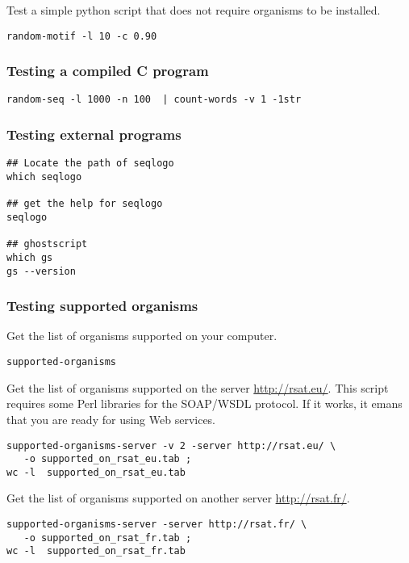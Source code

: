 \documentclass[12pt,a4paper, oneside]{scrreprt} %
\begin{document}
Test a simple python script that does not require organisms to be
installed.

\begin{lstlisting}
random-motif -l 10 -c 0.90
\end{lstlisting}

\subsubsection{Testing a compiled C program}

\begin{lstlisting}
random-seq -l 1000 -n 100  | count-words -v 1 -1str
\end{lstlisting}

\subsubsection{Testing external programs}

\begin{lstlisting}
## Locate the path of seqlogo
which seqlogo

## get the help for seqlogo
seqlogo

## ghostscript
which gs
gs --version
\end{lstlisting}


\subsubsection{Testing supported organisms}

Get the list of organisms supported on your computer.

\begin{lstlisting}
supported-organisms
\end{lstlisting}

Get the list of organisms supported on the server
\url{http://rsat.eu/}. This script requires some Perl libraries for
the SOAP/WSDL protocol. If it works, it emans that you are ready for
using \RSAT Web services.

\begin{lstlisting}
supported-organisms-server -v 2 -server http://rsat.eu/ \
   -o supported_on_rsat_eu.tab ; 
wc -l  supported_on_rsat_eu.tab
\end{lstlisting}

Get the list of organisms supported on another server
\url{http://rsat.fr/}.

\begin{lstlisting}
supported-organisms-server -server http://rsat.fr/ \
   -o supported_on_rsat_fr.tab ; 
wc -l  supported_on_rsat_fr.tab
\end{lstlisting}
\end{document}
